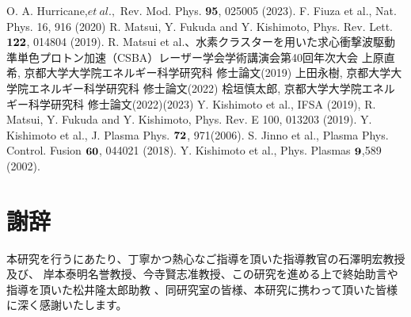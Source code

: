 \documentclass[a4paper,11pt,titlepage]{jarticle}
\numberwithin{equation}{section} %
\begin{document}
\begin{thebibliography}{999}
  O. A. Hurricane,$et\ al.,$ Rev. Mod. Phys. {\bf 95}, 025005 (2023).
   F. Fiuza et al., Nat. Phys. 16, 916 (2020)
   R. Matsui, Y. Fukuda and Y. Kishimoto, Phys. Rev. Lett. $\bf{122}$, 014804 (2019).
   R. Matsui et al.、水素クラスターを用いた求心衝撃波駆動　
  準単色プロトン加速（CSBA）レーザー学会学術講演会第40回年次大会
% 
   上原直希, 京都大学大学院エネルギー科学研究科 修士論文(2019)
   上田永樹, 京都大学大学院エネルギー科学研究科 修士論文(2022)
   桧垣慎太郎, 京都大学大学院エネルギー科学研究科 修士論文(2022)(2023)
   Y. Kishimoto et al., IFSA (2019), R. Matsui, Y. Fukuda and Y. Kishimoto, Phys. Rev. E 100, 013203 (2019).
   Y. Kishimoto et al., J. Plasma Phys. $\bf{72}$, 971(2006).
   S. Jinno et al., Plasma Phys. Control. Fusion $\bf{60}$, 044021 (2018).
   Y. Kishimoto et al., Phys. Plasmas $\bf{9}$,589 (2002).

  \end{thebibliography}

\newpage
\section*{謝辞}
本研究を行うにあたり、丁寧かつ熱心なご指導を頂いた指導教官の石澤明宏教授及び、
岸本泰明名誉教授、今寺賢志准教授、この研究を進める上で終始助言や指導を頂いた松井隆太郎助教
、同研究室の皆様、本研究に携わって頂いた皆様に深く感謝いたします。\\ \\
\\
\\
\end{document}
